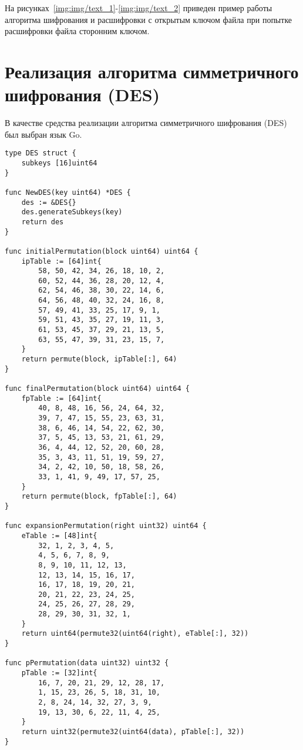 \clearpage
На рисунках~\ref{img:img/text_1}-\ref{img:img/text_2} приведен пример работы алгоритма шифрования и расшифровки с открытым ключом файла при попытке расшифровки файла сторонним ключом.

\FloatBarrier
{}
\FloatBarrier
{}
\FloatBarrier

\chapter{Реализация алгоритма симметричного шифрования (DES)}
В качестве средства реализации алгоритма симметричного шифрования (DES) был выбран язык Go.

\begin{lstlisting}[style=golang, caption={Реализация алгоритма шифрования и расшифровки с открытым ключом файла}, label=lst:codegolang]
type DES struct {
	subkeys [16]uint64
}

func NewDES(key uint64) *DES {
	des := &DES{}
	des.generateSubkeys(key)
	return des
}

func initialPermutation(block uint64) uint64 {
	ipTable := [64]int{
		58, 50, 42, 34, 26, 18, 10, 2,
		60, 52, 44, 36, 28, 20, 12, 4,
		62, 54, 46, 38, 30, 22, 14, 6,
		64, 56, 48, 40, 32, 24, 16, 8,
		57, 49, 41, 33, 25, 17, 9, 1,
		59, 51, 43, 35, 27, 19, 11, 3,
		61, 53, 45, 37, 29, 21, 13, 5,
		63, 55, 47, 39, 31, 23, 15, 7,
	}
	return permute(block, ipTable[:], 64)
}

func finalPermutation(block uint64) uint64 {
	fpTable := [64]int{
		40, 8, 48, 16, 56, 24, 64, 32,
		39, 7, 47, 15, 55, 23, 63, 31,
		38, 6, 46, 14, 54, 22, 62, 30,
		37, 5, 45, 13, 53, 21, 61, 29,
		36, 4, 44, 12, 52, 20, 60, 28,
		35, 3, 43, 11, 51, 19, 59, 27,
		34, 2, 42, 10, 50, 18, 58, 26,
		33, 1, 41, 9, 49, 17, 57, 25,
	}
	return permute(block, fpTable[:], 64)
}

func expansionPermutation(right uint32) uint64 {
	eTable := [48]int{
		32, 1, 2, 3, 4, 5,
		4, 5, 6, 7, 8, 9,
		8, 9, 10, 11, 12, 13,
		12, 13, 14, 15, 16, 17,
		16, 17, 18, 19, 20, 21,
		20, 21, 22, 23, 24, 25,
		24, 25, 26, 27, 28, 29,
		28, 29, 30, 31, 32, 1,
	}
	return uint64(permute32(uint64(right), eTable[:], 32))
}

func pPermutation(data uint32) uint32 {
	pTable := [32]int{
		16, 7, 20, 21, 29, 12, 28, 17,
		1, 15, 23, 26, 5, 18, 31, 10,
		2, 8, 24, 14, 32, 27, 3, 9,
		19, 13, 30, 6, 22, 11, 4, 25,
	}
	return uint32(permute32(uint64(data), pTable[:], 32))
}


\end{lstlisting}
